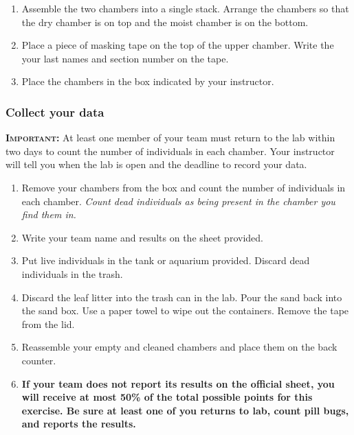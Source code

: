 \documentclass[12pt, hidelinks]{exam}
\begin{document}
\begin{questions}
\begin{enumerate}
	\item Assemble the two chambers into a single stack. Arrange the chambers so that the dry chamber is on top and the moist chamber is on the bottom.
	
	\item Place a piece of masking tape on the top of the upper chamber. Write the your last names and section number on the tape.
	
	\item Place the chambers in the box indicated by your instructor.
	
\end{enumerate}

\subsubsection*{Collect your data}


{\scshape \textbf{Important:}} At least one member of your team must return to the lab within two days to count the number of individuals in each chamber. Your instructor will tell you when the lab is open and the deadline to record your data. 

\begin{enumerate}
	\item Remove your chambers from the box and count the number of individuals in each chamber. \emph{Count dead individuals as being present in the chamber you find them in.}
	
	\item Write your team name and results on the sheet provided.
	
	\item Put live individuals in the tank or aquarium provided. Discard dead individuals in the trash.
	
	\item Discard the leaf litter into the trash can in the lab. Pour the sand back into the sand box. Use a paper towel to wipe out the containers. Remove the tape from the lid.
	
	\item Reassemble your empty and cleaned chambers and place them on the back counter. 
	
	\item \textbf{If your team does not report its results on the official sheet, you will receive at most 50\% of the total possible points for this exercise. Be sure at least one of you returns to lab, count pill bugs, and reports the results.}
		

\end{enumerate}
\end{questions}
\end{document}
